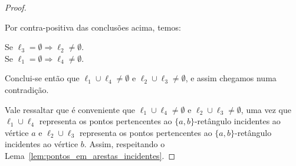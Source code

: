 \begin{proof}
\begin{figure}[H]
\begin{minipage}[t]{0.4\textwidth}
\begin{figure}[H]
\begin{adjustbox}{valign=t, raise=-25pt}
            \end{adjustbox}
            \label{fig:tikz-captions}
        \end{figure}
    \end{minipage}
    \vfill %
    \label{fig:chaves-buscas}
\end{figure}

Por contra-positiva das conclusões acima, temos:
\begin{center}
Se $\ell_3 = \emptyset \Rightarrow \ell_2 \neq \emptyset$. \\
Se $\ell_1 = \emptyset \Rightarrow \ell_4 \neq \emptyset$.
\end{center}

Conclui-se então que $\ell_1 \cup \ell_4  \neq \emptyset$ e $\ell_2 \cup \ell_3  \neq \emptyset$, e assim chegamos numa contradição.

Vale ressaltar que é conveniente que $\ell_1 \cup \ell_4  \neq \emptyset$ e $\ell_2 \cup \ell_3  \neq \emptyset$, uma vez que $\ell_1 \cup \ell_4$ representa os pontos pertencentes ao $\{a,b\}$-retângulo incidentes ao vértice $a$ e  $\ell_2 \cup \ell_3$ representa os pontos pertencentes ao $\{a,b\}$-retângulo incidentes ao vértice $b$. Assim, respeitando o Lema~\ref{lem:pontos_em_arestas_incidentes}.
\end{proof}

